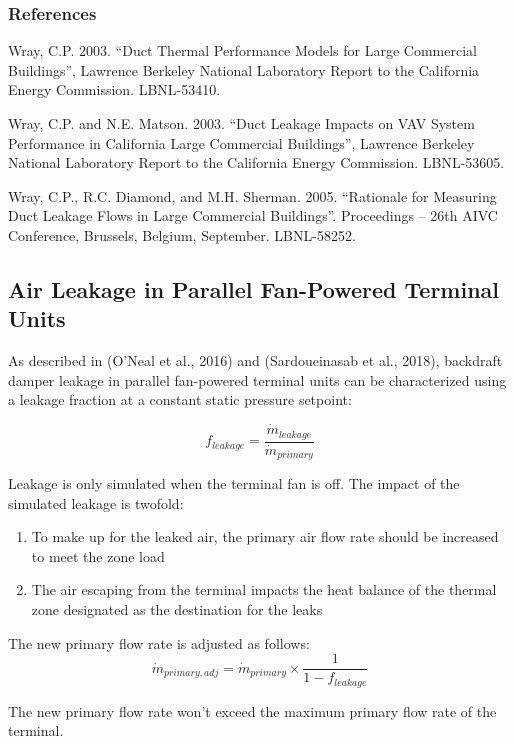 \subsubsection{References}\label{references-3-005}

Wray, C.P. 2003. ``Duct Thermal Performance Models for Large Commercial Buildings'', Lawrence Berkeley National Laboratory Report to the California Energy Commission. LBNL-53410.

Wray, C.P. and N.E. Matson. 2003. ``Duct Leakage Impacts on VAV System Performance in California Large Commercial Buildings'', Lawrence Berkeley National Laboratory Report to the California Energy Commission. LBNL-53605.

Wray, C.P., R.C. Diamond, and M.H. Sherman. 2005. ``Rationale for Measuring Duct Leakage Flows in Large Commercial Buildings''. Proceedings -- 26th AIVC Conference, Brussels, Belgium, September. LBNL-58252.

\subsection{Air Leakage in Parallel Fan-Powered Terminal Units}\label{parallel_piu_leakage}
As described in (O'Neal et al., 2016) and (Sardoueinasab et al., 2018), backdraft damper leakage in parallel fan-powered terminal units can be characterized using a leakage fraction at a constant static pressure setpoint:

\begin{equation}
{f_{leakage}} = \frac{\dot m_{leakage}}{\dot m_{primary}}
\end{equation}

Leakage is only simulated when the terminal fan is off. The impact of the simulated leakage is twofold:
\begin{enumerate}
    \item To make up for the leaked air, the primary air flow rate should be increased to meet the zone load
    \item The air escaping from the terminal impacts the heat balance of the thermal zone designated as the destination for the leaks
\end{enumerate}

The new primary flow rate is adjusted as follows:
\begin{equation}
{\dot m_{primary, adj}} = {\dot m_{primary}} \times \frac{1}{1 - {f_{leakage}}}
\end{equation}

The new primary flow rate won't exceed the maximum primary flow rate of the terminal.

